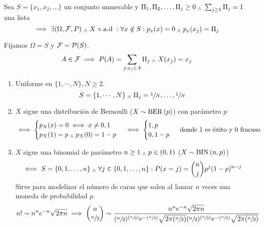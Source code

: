 \begin{teo}
    Sea $S=\{x_1, x_2, \dots \}$ un conjunto numerable y $\Pi_1, \Pi_2, \dots, \Pi_j\geq0 \; _{\wedge} \; \sum_{j\geq 1}\Pi_j=1$ una lista
    \[\implies \exists (\Omega, \mathcal{F}, P) \; _{\wedge} \; X\text{ v.a.d }:\forall  x\notin S :p_x(x)= 0 \; _{\wedge} \; p_x(x_j)=\Pi_j\]
    \begin{dem}
        Fijamos $\Omega = S$ y $\mathcal{F}=\mathcal{P}(S)$.
        \[A\in \mathcal{F} \implies P(A)=\sum_{j:x_j\in A}\Pi_j \; _{\wedge} \; X(x_j)=x_j\]
    \end{dem}
\end{teo}

\begin{ejem}[Dados]
    \begin{enumerate}
        \item Uniforme en $\{1, \cdots, N\}, N\geq2$.
        \[S=\{1, \cdots, N\} \; _{\wedge} \; {\Pi_j}={\sfrac{1}{N}, \dots, \sfrac{1}{N}}\]
        \item $X$ sigue una distribución de Bernoulli ($X\sim\operatorname{BER}\left(p\right)$) con parámetro $p$
        \[\iff \begin{cases}
            p_X(x)=0 \iff x\ne 0, 1 \\
            p_X(1)=p \; _{\wedge} \; p_X(0)=1-p
        \end{cases}\iff\begin{cases}
            1, p\\
            0, 1-p
        \end{cases}\text{ donde $1$ es éxito y $0$ fracaso}\]
        \item $X$ sigue una binomial de parámetro $n\geq 1 \; _{\wedge} \; p\in (0, 1)$ ($X\sim\operatorname{BIN}\left(n, p\right)$)
        \[\iff S=\{0, 1, \dots, n\} \; _{\wedge} \; \forall j\in \{0, 1, \dots, n\}:P(x=j)=\binom{n}{j}p^j(1-p)^{n-j}\]
        Sirve para modelizar el número de caras que salen al lanzar $n$ veces una moneda de probabilidad $p$.
        \[n! \sim n^ne^{-n}\sqrt{2\pi n}\implies \binom{n}{\sfrac{n}{2}}\sim\frac{n^ne^{-n}\sqrt{2\pi n}}{(\sfrac{n}        {2})^{(\sfrac{n}{2})}e^{-(\sfrac{n}{2})}\sqrt{2\pi (\sfrac{n}{2})}(\sfrac{n}{2})^{(\sfrac{n}{2})}e^{-(\sfrac{n}     {2})}\sqrt{2\pi (\sfrac{n}{2})}}\]
        

\end{enumerate}
\end{ejem}
